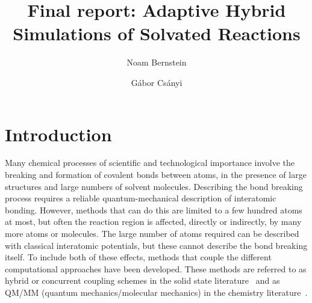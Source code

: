 \documentclass[11pt]{revtex4}
\begin{document}
\title{Final report: Adaptive Hybrid Simulations of Solvated Reactions}

\author{Noam Bernstein}

\author{G\'abor Cs\'anyi}

\maketitle

\section{Introduction}

Many chemical processes of scientific and technological importance
involve the breaking and formation of covalent bonds between atoms,
in the presence of large structures and large numbers of solvent
molecules.  Describing the bond breaking process requires a reliable
quantum-mechanical description of interatomic bonding.  However,
methods that can do this are limited to a few hundred atoms at most, but often
the reaction region is affected, directly or indirectly, by many
more atoms or molecules.  The large number of atoms required can
be described with classical interatomic potentials, but these cannot describe the bond breaking itself.  To include both of these
effects, methods that couple the different computational approaches
have been developed.  These methods are referred to as hybrid or
concurrent coupling schemes in the solid state
literature~\cite{curtin_model_simul_mater_sci_eng_2003a,csanyi_j_phys_condens_mater_2005a,bernstein_rep_prog_phys_2009a} and
as QM/MM (quantum mechanics/molecular mechanics) in the chemistry
literature~\cite{senn_topics_cur_chem_2007a,lin_theor_chem_acc_2005a}.
\end{document}
